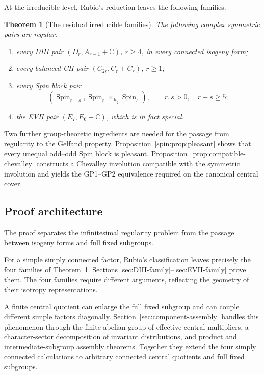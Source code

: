 \documentclass[10pt,a4paper]{amsart}
\numberwithin{equation}{section}
\newtheorem{theorem}{Theorem}[section]
\newcommand{\C}{\mathbb C}
\newcommand{\Spin}{\operatorname{Spin}}
\begin{document}
At the irreducible level, Rubio's reduction leaves the following families.

\begin{theorem}[The residual irreducible families]\label{thm:four-inputs}
The following complex symmetric pairs are regular.
\begin{enumerate}[label=\textup{(\roman*)}]
\item every DIII pair $(D_r,A_{r-1}+\C)$, $r\geq4$, in every connected
isogeny form;
\item every balanced CII pair $(C_{2r},C_r+C_r)$, $r\geq1$;
\item every Spin block pair
\[
 (\Spin_{r+s},\Spin_r\times_{\mu_2}\Spin_s),\qquad r,s>0,\quad r+s\geq5;
\]
\item the EVII pair $(E_7,E_6+\C)$, which is in fact special.
\end{enumerate}
\end{theorem}

Two further group-theoretic ingredients are needed for the passage from
regularity to the Gelfand property.  Proposition~\ref{spin:prop:pleasant} shows that every
unequal odd--odd Spin block is pleasant.  Proposition~\ref{prop:compatible-chevalley}
constructs a Chevalley involution compatible with the symmetric involution and
yields the GP1--GP2 equivalence required on the canonical central cover.

\subsection{Proof architecture}

The proof separates the infinitesimal regularity problem from the passage
between isogeny forms and full fixed subgroups.

For a simple simply connected factor, Rubio's classification leaves precisely
the four families of Theorem~\ref{thm:four-inputs}.  Sections
\ref{sec:DIII-family}--\ref{sec:EVII-family} prove them.  The four families require different arguments, reflecting the geometry of
their isotropy representations.

A finite central quotient can enlarge the full fixed subgroup and can couple
different simple factors diagonally.  Section~\ref{sec:component-assembly}
handles this phenomenon through the finite abelian group of effective central
multipliers, a character-sector decomposition of invariant distributions, and
product and intermediate-subgroup assembly theorems.  Together they extend the four simply connected calculations to arbitrary
connected central quotients and full fixed subgroups.
\end{document}
